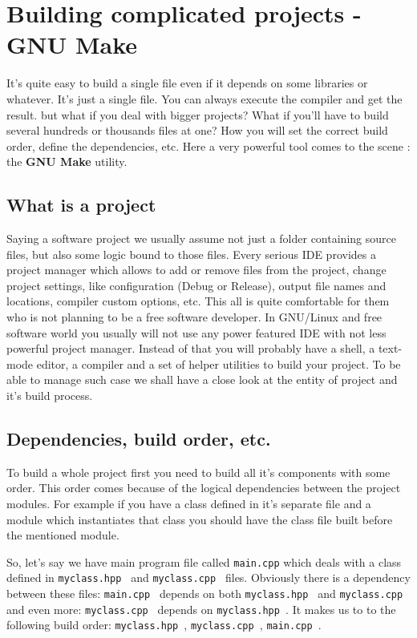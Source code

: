 
\section{Building complicated projects - GNU Make}
\label{make}
It's quite easy to build a single file even if it depends on some libraries or whatever. It's just a single file. You can always execute the compiler and get the result. but what if you deal with bigger projects? What if you'll have to build several hundreds or thousands files at one? How you will set the correct build order, define the dependencies, etc. Here a very powerful tool comes to the scene : the \textbf {GNU Make} utility.

\subsection{What is a project}
Saying a software project we usually assume not just a folder containing source files, but also some logic bound to those files. Every serious IDE provides a project manager which allows to add or remove files from the project, change project settings, like configuration (Debug or Release), output file names and locations, compiler custom options, etc. This all is quite comfortable for them who is not planning to be a free software developer. In GNU/Linux and free software world you usually will not use any power featured IDE with not less powerful project manager. Instead of that you will probably have a shell, a text-mode editor, a compiler and a set of helper utilities to build your project. To be able to manage such case we shall have a close look at the entity of project and it's build process.

\subsection{Dependencies, build order, etc.}
\label{deps_order_etc}
To build a whole project first you need to build all it's components with some order. This order comes because of the logical dependencies between the project modules. For example if you have a class defined in it's separate file and a module which instantiates that class you should have the class file built before the mentioned module.

So, let's say we have main program file called {\tt main.cpp} which deals with a class defined in {\tt myclass.hpp } and {\tt myclass.cpp } files. Obviously there is a dependency between these files: {\tt main.cpp } depends on both {\tt myclass.hpp } and {\tt myclass.cpp } and even more: {\tt myclass.cpp } depends on {\tt myclass.hpp }. It makes us to to the following build order: {\tt myclass.hpp }, {\tt myclass.cpp }, {\tt main.cpp }.

